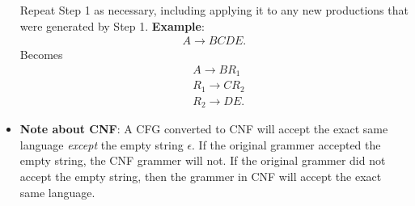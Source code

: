 \documentclass{report}
\begin{document}
\begin{itemize}
            Repeat Step 1 as necessary, including applying it to any new productions that were generated by Step 1.
            \bigbreak \noindent 
            \textbf{Example}: 
            \begin{align*}
                A \to BCDE 
            .\end{align*}
            Becomes
            \begin{align*}
                &A \to BR_{1} \\
                &R_{1} \to CR_{2} \\
                &R_{2}\to DE
            .\end{align*}
        \item \textbf{Note about CNF}: A CFG converted to CNF will accept the exact same language \textit{except} the empty string $\epsilon$. If the original grammer accepted the empty string, the CNF grammer will not. If the original grammer did not accept the empty string, then the grammer in CNF will accept the exact same language.



    \end{itemize}

    \pagebreak 
\end{document}
